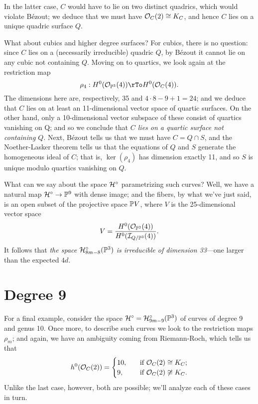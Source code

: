 In the latter case, $C$ would have to lie on two distinct quadrics, which would violate B\'ezout; we deduce that we must have ${\mathcal O}_C(2) \cong K_C$, and hence $C$ lies on a unique quadric surface $Q$.

What about cubics and higher degree surfaces? For cubics, there is no question: since $C$ lies on a (necessarily irreducible) quadric $Q$, by B\'ezout it cannot lie on any cubic not containing $Q$. Moving on to quartics, we look again at the restriction map
$$
\rho_4 : H^0(\cO_{\PP^3}(4)) \rTo H^0(\cO_C(4)).
$$
The dimensions here are, respectively, 35 and $4\cdot 8 - 9 + 1 = 24$; and we deduce that $C$ lies on at least an 11-dimensional vector space of quartic surfaces. On the other hand, only a 10-dimensional vector subspace of these consist of quartics vanishing on Q; and so we conclude that \emph{$C$ lies on a quartic surface not containing $Q$}. Next, B\'ezout tells us that we must have $C = Q \cap S$, and the Noether-Lasker theorem tells us that the equations of $Q$ and $S$ generate the homogeneous ideal of $C$; that is, $\ker(\rho_4)$ has dimension exactly 11, and so $S$ is unique modulo quartics vanishing on $Q$.

What can we say about the space ${\cal H}^\circ$ parametrizing such curves? Well, we have a natural map ${\cal H}^\circ \to {\mathbb P}^9$ with dense image; and the fibers, by what we've just said, is an open subset of the projective space ${\mathbb P} V$, where $V$ is the 25-dimensional vector space
$$
V = \frac{H^0({\mathcal O}_{{\mathbb P}^3}(4))}{H^0({\mathcal I}_{Q/{\mathbb P}^3}(4))}.
$$
It follows that \emph{the space ${\cal H}^\circ_{8m-8}({\mathbb P}^3)$ is irreducible of dimension 33}---one larger than the expected $4d$.


\section{Degree 9}

For a final example, consider the space ${\cal H}^\circ = {\cal H}^\circ_{9m-9}({\mathbb P}^3)$ of curves of degree 9 and genus 10. Once more, to describe such curves we look to the restriction maps $\rho_m$; and again, we have an ambiguity coming from Riemann-Roch, which tells us that
\begin{align*}
h^0({\mathcal O}_C(2)) =
\begin{cases}
10, \quad &\text{if } {\mathcal O}_C(2) \cong K_C; \\
9,  \quad &\text{if } {\mathcal O}_C(2) \not\cong K_C.
\end{cases}
\end{align*}
Unlike the last case, however, both are possible; we'll analyze each of these cases in turn.

